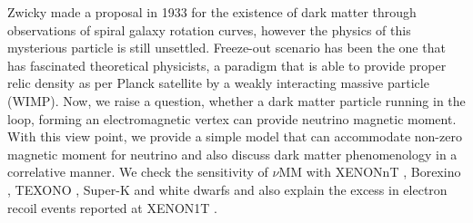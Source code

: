 \documentclass[aps, a4paper,superscriptaddress,12pt,preprintnumbers,floatfix,nofootinbib,amsmath,amssymb]{revtex4}
\begin{document}

Zwicky made a proposal in 1933 for the existence of dark matter through observations of spiral galaxy rotation curves, however the physics of this mysterious particle is still unsettled. Freeze-out scenario has been the one that has fascinated theoretical physicists, a paradigm that is able to provide proper relic density as per Planck satellite by a weakly interacting massive particle (WIMP). Now, we raise a question, whether a dark matter particle running in the loop, forming an electromagnetic vertex can provide neutrino magnetic moment. With this view point, we provide a simple model that can accommodate non-zero magnetic moment for neutrino and also discuss dark matter phenomenology in a correlative manner. We check the sensitivity of $\nu$MM with XENONnT \cite{XENON:2022ltv}, Borexino \cite{Borexino:2017fbd}, TEXONO \cite{TEXONO:2006xds}, Super-K \cite{Super-Kamiokande:2004wqk} and white dwarfs \cite{MillerBertolami:2014oki} and also explain the excess in electron recoil events reported at XENON1T \cite{XENON:2020rca}. 
\end{document}
